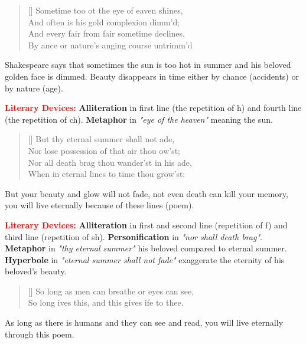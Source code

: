 \documentclass[12pt, a4paper]{article}
\begin{document}
{\begin{verse}[\versewidth]
{\fontverse
Sometime too ot the eye of eaven shines, \\
And often is his gold complexion dimm'd; \\
And every fair from fair sometime declines, \\
By ance or nature’s anging course untrimm'd
}
\end{verse}

Shakespeare says that sometimes the sun is too hot in summer and his beloved 
golden face is dimmed. Beauty disappears in time either by 
chance (accidents) or by nature (age).\smallbreak

\textbf{\textcolor{red}{Literary Devices:}} \textbf{Alliteration} in first line
(the repetition of h) and fourth line (the repetition of ch). \textbf{Metaphor} in 
\textit{"eye of the heaven"} meaning the sun. 

\begin{verse}[\versewidth]
{\fontverse
But thy eternal summer shall not ade, \\
Nor lose possession of that air thou ow’st; \\
Nor all death brag thou wander’st in his ade, \\
When in eternal lines to time thou grow’st:
}
\end{verse}
But your beauty and glow will not fade, not even death can
kill your memory, you will live eternally because of these
lines (poem).\smallbreak

\textbf{\textcolor{red}{Literary Devices:}} \textbf{Alliteration} in first and second line
(repetition  of f) and third line (repetition of sh). \textbf{Personification} in
\textit{"nor shall death brag"}. \textbf{Metaphor} in \textit{"thy eternal summer"} his 
beloved compared to eternal summer. \textbf{Hyperbole} in \textit{"eternal summer shall not fade"}
exaggerate the eternity of his beloved's beauty.

\begin{verse}[\versewidth]
{\fontverse
So long as men can breathe or eyes can see,\\
So long ives this, and this gives ife to thee.
}
\end{verse}
As long as there is humans and they can see and read,
you will live eternally through this poem.



}
\end{document}
